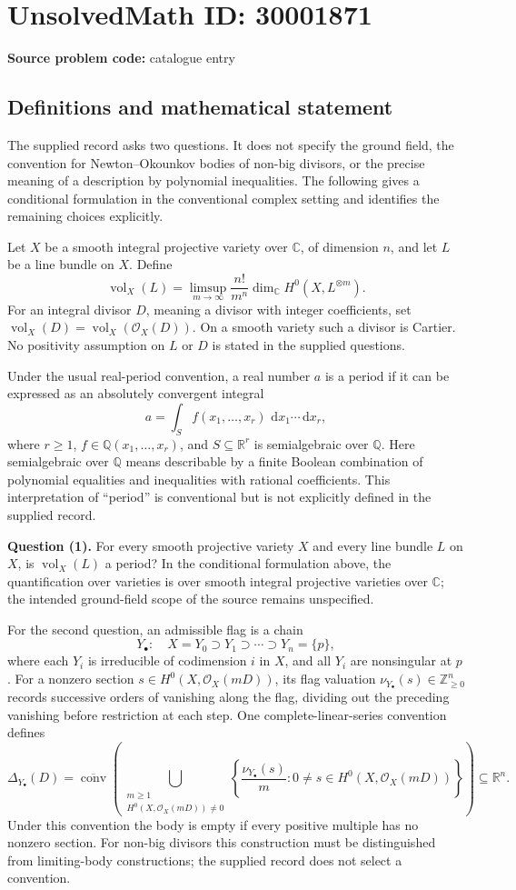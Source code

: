 \documentclass[11pt]{article}
\newcommand{\Z}{\mathbb{Z}}
\newcommand{\Q}{\mathbb{Q}}
\newcommand{\R}{\mathbb{R}}
\newcommand{\C}{\mathbb{C}}
\newcommand{\dd}{\,\mathrm{d}}
\begin{document}
\section*{UnsolvedMath ID: 30001871}
\textbf{Source problem code:} catalogue entry
\subsection{Definitions and mathematical statement}
The supplied record asks two questions. It does not specify the ground field, the convention for Newton--Okounkov bodies of non-big divisors, or the precise meaning of a description by polynomial inequalities. The following gives a conditional formulation in the conventional complex setting and identifies the remaining choices explicitly.

Let \(X\) be a smooth integral projective variety over \(\C\), of dimension \(n\), and let \(L\) be a line bundle on \(X\). Define
\[
\operatorname{vol}_X(L)=\limsup_{m\to\infty}\frac{n!}{m^n}\dim_{\C}H^0(X,L^{\otimes m}).
\]
For an integral divisor \(D\), meaning a divisor with integer coefficients, set \(\operatorname{vol}_X(D)=\operatorname{vol}_X(\mathcal O_X(D))\). On a smooth variety such a divisor is Cartier. No positivity assumption on \(L\) or \(D\) is stated in the supplied questions.

Under the usual real-period convention, a real number \(a\) is a period if it can be expressed as an absolutely convergent integral
\[
a=\int_S f(x_1,\ldots,x_r)\,\dd x_1\cdots\dd x_r,
\]
where \(r\geq 1\), \(f\in\Q(x_1,\ldots,x_r)\), and \(S\subseteq\R^r\) is semialgebraic over \(\Q\). Here semialgebraic over \(\Q\) means describable by a finite Boolean combination of polynomial equalities and inequalities with rational coefficients. This interpretation of ``period'' is conventional but is not explicitly defined in the supplied record.

\textbf{Question (1).} For every smooth projective variety \(X\) and every line bundle \(L\) on \(X\), is \(\operatorname{vol}_X(L)\) a period? In the conditional formulation above, the quantification over varieties is over smooth integral projective varieties over \(\C\); the intended ground-field scope of the source remains unspecified.

For the second question, an admissible flag is a chain
\[
Y_\bullet:\quad X=Y_0\supset Y_1\supset\cdots\supset Y_n=\{p\},
\]
where each \(Y_i\) is irreducible of codimension \(i\) in \(X\), and all \(Y_i\) are nonsingular at \(p\). For a nonzero section \(s\in H^0(X,\mathcal O_X(mD))\), its flag valuation \(\nu_{Y_\bullet}(s)\in\Z_{\geq 0}^n\) records successive orders of vanishing along the flag, dividing out the preceding vanishing before restriction at each step. One complete-linear-series convention defines
\[
\Delta_{Y_\bullet}(D)=\overline{\operatorname{conv}}\left(\bigcup_{\substack{m\geq1\\H^0(X,\mathcal O_X(mD))\neq0}}\left\{\frac{\nu_{Y_\bullet}(s)}m:0\neq s\in H^0(X,\mathcal O_X(mD))\right\}\right)\subseteq\R^n.
\]
Under this convention the body is empty if every positive multiple has no nonzero section. For non-big divisors this construction must be distinguished from limiting-body constructions; the supplied record does not select a convention.
\end{document}

